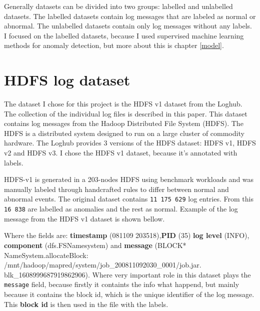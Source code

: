 Generally datasets can be divided into two groups: labelled and unlabelled datasets. The labelled datasets contain log messages that are labeled as normal or abnormal. The unlabelled datasets contain only log messages without any labels.
I focused on the labelled datasets, because I used supervised machine learning methods for anomaly detection, but more about this is chapter \ref{model}.

\section{HDFS log dataset} \label{hdfs}

The dataset I chose for this project is the HDFS v1 dataset from the Loghub. The collection of the individual log files is described in this paper\cite{zhu2023loghub}. %
This dataset contains log messages from the Hadoop Distributed File System (HDFS). The HDFS is a distributed 
system designed to run on a large cluster of commodity hardware. The Loghub provides 3 versions of the HDFS dataset: HDFS v1, HDFS v2 and HDFS v3. I chose the HDFS v1 dataset, because it's annotated with labels.

HDFS-v1 is generated in a 203-nodes HDFS using benchmark workloads and was manually labeled through handcrafted rules to differ between normal and abnormal events. The original dataset contains \texttt{11 175 629} log entries.
From this \texttt{16 838} are labelled as anomalies and the rest as normal. Example of the log message from the HDFS v1 dataset is shown bellow.

\begin{center}
\end{center}

Where the fields are: \textbf{timestamp} (081109 203518),\textbf{PID} (35) \textbf{log level} (INFO), \textbf{component} (dfs.FSNamesystem) and \textbf{message} (BLOCK* NameSystem.allocateBlock: /mnt/hadoop/mapred/system/job\_200811092030\_0001/job.jar. blk\_1608999687919862906).
Where very important role in this dataset plays the \texttt{message} field, because firstly it containts the info what happend, but mainly because it contains the block id, which is the unique identifier of the log message.
This \textbf{block id} is then used in the file with the labels.

